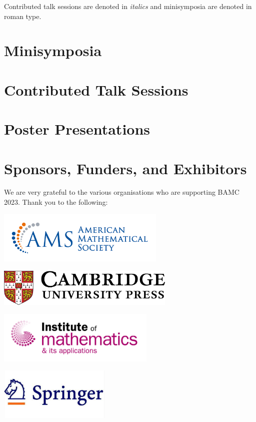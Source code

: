 \documentclass[12pt,a4paper]{article}
\begin{document}
Contributed talk sessions are denoted in \textit{italics} and minisymposia are denoted in roman type.

\section{Minisymposia}



\section{Contributed Talk Sessions}



\section{Poster Presentations}

{\footnotesize\raggedright}

\section{Sponsors, Funders, and Exhibitors}

We are very grateful to the various organisations who are supporting BAMC 2023. Thank you to the following:\bigskip

{\centering
\includegraphics[height=2.5cm]{ams-logo.png}

\includegraphics[height=1.8cm]{cup-logo.png}

\includegraphics[height=2.5cm]{ima-logo.png}

\includegraphics[height=2.5cm]{springer-logo.jpg}

}
\end{document}
